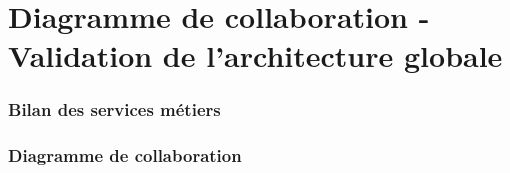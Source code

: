 \part{Diagramme de collaboration - Validation de l'architecture globale}
\setcounter{section}{0}

\section{Bilan des services métiers}


\section{Diagramme de collaboration}

